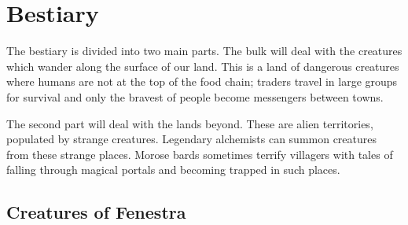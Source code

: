 \chapter{Bestiary}

\setcounter{bestiarychapter}{\thechapter}
The bestiary is divided into two main parts.  The bulk will deal with the creatures which wander along the surface of our land.  This is a land of dangerous creatures where humans are not at the top of the food chain; traders travel in large groups for survival and only the bravest of people become messengers between towns.

The second part will deal with the lands beyond.  These are alien territories, populated by strange creatures.  Legendary alchemists can summon creatures from these strange places.  Morose bards sometimes terrify villagers with tales of falling through magical portals and becoming trapped in such places.

\section{Creatures of Fenestra}

